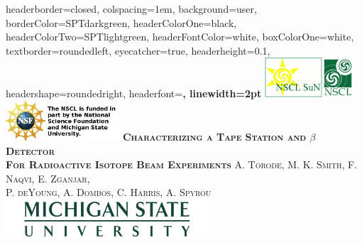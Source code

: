 \documentclass[landscape,a0paper,fontscale=0.28]{baposter} %
\begin{document}
\begin{poster}
{
headerborder=closed, %
colspacing=1em, %
background=user,
borderColor=SPTdarkgreen, %
headerColorOne=black, %
headerColorTwo=SPTlightgreen, %
headerFontColor=white, %
boxColorOne=white, %
textborder=roundedleft, %
eyecatcher=true, %
headerheight=0.1\textheight, %
headershape=roundedright, %
headerfont=\Large\bf\textsc, %
linewidth=2pt %
}
%
{\includegraphics[height=4em]{SuNlogo.png}\includegraphics[height=4em]{nscl.png}\includegraphics[height=4em]{nsftext.png}} %
{\bf\textsc{\LARGE Characterizing a Tape Station and $\beta$ Detector \\ For Radioactive Isotope Beam Experiments}\vspace{0.1em}} %
{\textsc{\large A. Torode, M. K. Smith, F. Naqvi, E. Zganjar, \\ P. deYoung, A. Dombos, C. Harris, A. Spyrou}} %
{\includegraphics[height=4em]{MSUwide.png}} %


\end{poster}
\end{document}
